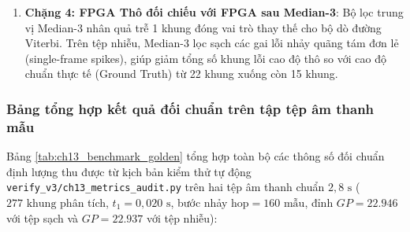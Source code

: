 \begin{enumerate}
    \item \textbf{Chặng 4: FPGA Thô đối chiếu với FPGA sau Median-3}:
    Bộ lọc trung vị Median-3 nhân quả trễ 1 khung đóng vai trò thay thế cho bộ dò đường Viterbi. Trên tệp nhiễu, Median-3 lọc sạch các gai lỗi nhảy quãng tám đơn lẻ (single-frame spikes), giúp giảm tổng số khung lỗi cao độ thô so với cao độ chuẩn thực tế (Ground Truth) từ 22 khung xuống còn 15 khung.
\end{enumerate}

\subsubsection*{Bảng tổng hợp kết quả đối chuẩn trên tập tệp âm thanh mẫu}
Bảng \ref{tab:ch13_benchmark_golden} tổng hợp toàn bộ các thông số đối chuẩn định lượng thu được từ kịch bản kiểm thử tự động \texttt{verify\_v3/}\allowbreak\texttt{ch13\_metrics\_}\allowbreak\texttt{audit.py} trên hai tệp âm thanh chuẩn $2{,}8\text{ s}$ ($277\text{ khung}$ phân tích, $t_1 = 0{,}020\text{ s}$, bước nhảy $\text{hop} = 160\text{ mẫu}$, đỉnh $GP = 22.946$ với tệp sạch và $GP = 22.937$ với tệp nhiễu):

